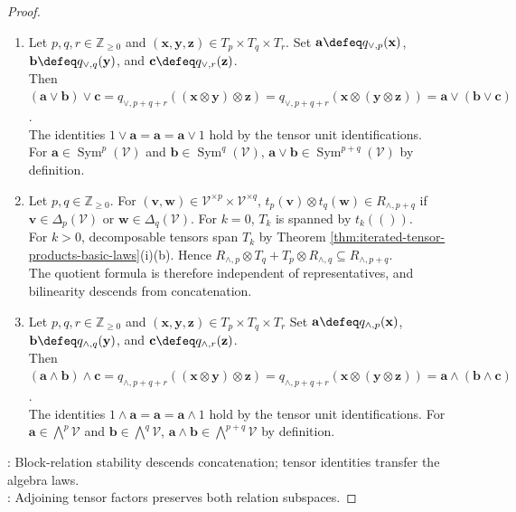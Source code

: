 \begin{proposition}
\begin{proof}
\begin{enumerate}[label=(\roman*)]
\item Let $p,q,r\in\mathbb{Z}_{\geq0}$ and $(\mathbf{x},\mathbf{y},\mathbf{z})\in T_p\times T_q\times T_r$. Set $\mathbf{a}\defeq q_{\vee,p}(\mathbf{x})$, $\mathbf{b}\defeq q_{\vee,q}(\mathbf{y})$, and $\mathbf{c}\defeq q_{\vee,r}(\mathbf{z})$.\\
Then $(\mathbf{a}\vee\mathbf{b})\vee\mathbf{c}=q_{\vee,p+q+r}((\mathbf{x}\otimes\mathbf{y})\otimes\mathbf{z})=q_{\vee,p+q+r}(\mathbf{x}\otimes(\mathbf{y}\otimes\mathbf{z}))=\mathbf{a}\vee(\mathbf{b}\vee\mathbf{c})$.\\
The identities $1\vee\mathbf{a}=\mathbf{a}=\mathbf{a}\vee1$ hold by the tensor unit identifications.\\
For $\mathbf{a}\in\operatorname{Sym}^{p}(\mathcal{V})$ and $\mathbf{b}\in\operatorname{Sym}^{q}(\mathcal{V})$, $\mathbf{a}\vee\mathbf{b}\in\operatorname{Sym}^{p+q}(\mathcal{V})$ by definition.
\item Let $p,q\in\mathbb{Z}_{\geq0}$. For $(\mathbf{v},\mathbf{w})\in\mathcal{V}^{\times p}\times\mathcal{V}^{\times q}$, $t_p(\mathbf{v})\otimes t_q(\mathbf{w})\in R_{\wedge,p+q}$ if $\mathbf{v}\in\Delta_p(\mathcal{V})$ or $\mathbf{w}\in\Delta_q(\mathcal{V})$. For $k=0$, $T_k$ is spanned by $t_k(())$.\\
For $k>0$, decomposable tensors span $T_k$ by Theorem \ref{thm:iterated-tensor-products-basic-laws}(i)(b). Hence $R_{\wedge,p}\otimes T_q+T_p\otimes R_{\wedge,q}\subseteq R_{\wedge,p+q}$.\\
The quotient formula is therefore independent of representatives, and bilinearity descends from concatenation.
\item Let $p,q,r\in\mathbb{Z}_{\geq0}$ and $(\mathbf{x},\mathbf{y},\mathbf{z})\in T_p\times T_q\times T_r$ Set $\mathbf{a}\defeq q_{\wedge,p}(\mathbf{x})$, $\mathbf{b}\defeq q_{\wedge,q}(\mathbf{y})$, and $\mathbf{c}\defeq q_{\wedge,r}(\mathbf{z})$.\\
Then $(\mathbf{a}\wedge\mathbf{b})\wedge\mathbf{c}=q_{\wedge,p+q+r}((\mathbf{x}\otimes\mathbf{y})\otimes\mathbf{z})=q_{\wedge,p+q+r}(\mathbf{x}\otimes(\mathbf{y}\otimes\mathbf{z}))=\mathbf{a}\wedge(\mathbf{b}\wedge\mathbf{c})$.\\
The identities $1\wedge\mathbf{a}=\mathbf{a}=\mathbf{a}\wedge1$ hold by the tensor unit identifications. For $\mathbf{a}\in\bigwedge^{p}\mathcal{V}$ and $\mathbf{b}\in\bigwedge^{q}\mathcal{V}$, $\mathbf{a}\wedge\mathbf{b}\in\bigwedge^{p+q}\mathcal{V}$ by definition.
\end{enumerate}
: Block-relation stability descends concatenation; tensor identities transfer the algebra laws.\\
: Adjoining tensor factors preserves both relation subspaces.
\end{proof}
\end{proposition}
